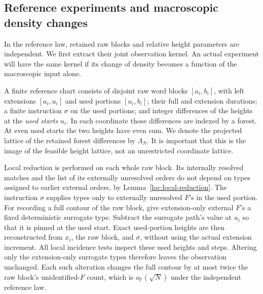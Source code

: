 \subsection{Reference experiments and macroscopic density changes}

In the reference law, retained raw blocks and relative height parameters
are independent. We first extract their joint observation kernel. An
actual experiment will have the same kernel if its change of density
becomes a function of the macroscopic input alone.

A finite reference chart consists of disjoint raw word blocks
$[a_i,b_i]$, with left extensions $[a_i,u_i]$ and used portions
$[u_i,b_i]$; their full and extension durations; a finite instruction $\sigma$ on the used
portions; and integer differences of the heights at the \emph{used starts}
$u_i$.  In each coordinate those differences are indexed by a forest.
At even used starts the two heights
have even sum.  We denote the projected lattice of the retained forest
differences by $\Lambda_N$.  It is important that this is the image of
the feasible height lattice, not an unrestricted coordinate lattice.

Local reduction is performed on each whole raw block.  Its internally
resolved matches and the list of its externally unresolved orders do
not depend on types assigned to earlier external orders, by
Lemma~\ref{loc:local-reduction}.  The instruction $\sigma$ supplies
types only to externally unresolved $F$'s in the used portion.  For
recording a full contour of the raw block, give extension-only external
$F$'s a fixed deterministic surrogate type.  Subtract the surrogate
path's value at $u_i$ so that it is pinned at the used start.  Exact
used-portion heights are then reconstructed from $x_i$, the raw block,
and $\sigma$, without using the actual extension increment.  All local
incidence tests inspect these used heights and steps.  Altering only
the extension-only surrogate types therefore leaves the observation
unchanged.  Each such alteration changes the full contour by at most
twice the raw block's unidentified-$F$ count, which is
$o_{\mathbb P}(\sqrt N)$ under the independent reference law.

